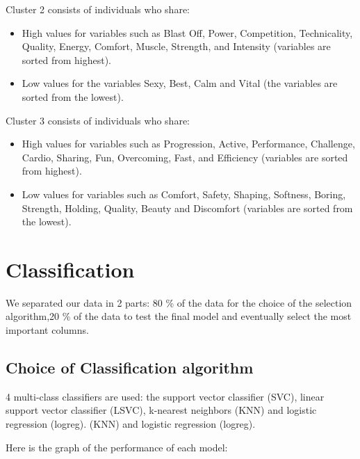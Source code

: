 \documentclass[12pt]{article}
\begin{document}
Cluster 2 consists of individuals who share:


\begin{itemize}
    \item High values for variables such as Blast Off, Power, Competition, Technicality, Quality, Energy, Comfort, Muscle, Strength, and Intensity (variables are sorted from highest).
    \item Low values for the variables Sexy, Best, Calm and Vital (the variables are sorted from the lowest).
\end{itemize}

Cluster 3 consists of individuals who share:

\begin{itemize}
    \item High values for variables such as Progression, Active, Performance, Challenge, Cardio, Sharing, Fun, Overcoming, Fast, and Efficiency (variables are sorted from highest).

    \item Low values for variables such as Comfort, Safety, Shaping, Softness, Boring, Strength, Holding, Quality, Beauty and Discomfort (variables are sorted from the lowest).

\end{itemize}


\section{Classification}  %
 
 We separated our data in 2 parts: 80 \% of the data for the choice of the selection algorithm,20 \% of the data to test the final model and eventually select the most important columns.
 
 
\subsection{Choice of Classification algorithm} 

 4 multi-class classifiers are used: the support vector classifier
(SVC), linear support vector classifier
(LSVC), k-nearest neighbors (KNN) and logistic regression (logreg). 
(KNN) and logistic regression (logreg).

\vspace{0.4 cm}

Here is the graph of the performance of each model: 
\end{document}

